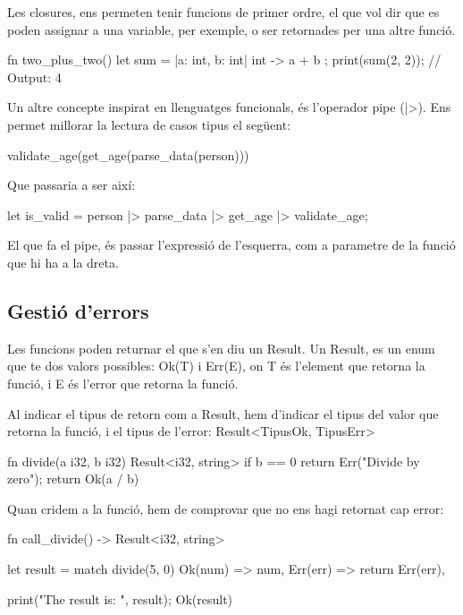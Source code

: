 ﻿\documentclass{article}
\begin{document}
Les closures, ens permeten tenir funcions de primer ordre, el que vol dir que 
es poden assignar a una variable, per exemple, o ser retornades per una altre 
funció.

\begin{code}
fn two_plus_two() {
    let sum = |a: int, b: int| int -> {
        a + b
    };
    print(sum(2, 2)); // Output: 4
}
\end{code}

Un altre concepte inspirat en llenguatges funcionals, és l'operador pipe (|>). 
Ens permet millorar la lectura de casos tipus el següent:

\begin{code}
validate_age(get_age(parse_data(person)))
\end{code}

Que passaria a ser així:

\begin{code}
let is_valid = 
    person
    |> parse_data
    |> get_age
    |> validate_age;
\end{code}

El que fa el pipe, és passar l'expressió de l'esquerra, com a parametre de la 
funció que hi ha a la dreta.

\subsection{Gestió d'errors}

Les funcions poden returnar el que s'en diu un Result. Un Result, es un enum
que te dos valors possibles: {\ttfamily Ok(T) i Err(E)}, on T és l'element que retorna la 
funció, i E és l'error que retorna la funció.

Al indicar el tipus de retorn com a Result, hem d'indicar el tipus del valor que 
retorna la funció, i el tipus de l'error: {\ttfamily Result<TipusOk, TipusErr> }

\begin{code}
fn divide(a i32, b i32) Result<i32, string> {
    if b == 0 {
        return Err("Divide by zero");
    }
    return Ok(a / b)
}
\end{code}

Quan cridem a la funció, hem de comprovar que no ens hagi retornat cap error:

\begin{code}
fn call_divide() -> Result<i32, string> {
    let result = match divide(5, 0) {
        Ok(num) => num,
        Err(err) => return Err(err),
    }

    print("The result is: ", result);
    Ok(result)
}
\end{code}
\end{document}

